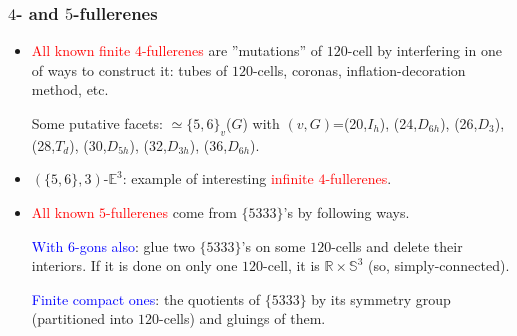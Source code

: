 \documentclass{beamer}
\begin{document}
\begin{frame}\frametitle{ $4$- and $5$-fullerenes}
\vspace{-2mm} 

\begin{itemize}
\item \textcolor{red}{All known finite $4$-fullerenes} are ''mutations'' of  
$120$-cell 
by interfering in 
one of ways to 
construct it: tubes of $120$-cells, coronas, inflation-decoration method, etc.

Some putative facets: $\simeq \{5,6\}_v$($G$) with $(v,G)$=(20,$I_h$), 
(24,$D_{6h}$), (26,$D_3$), (28,$T_d$), (30,$D_{5h}$), (32,$D_{3h}$), (36,$D_{6h}$).
\item $(\{5,6\},3)$-$\mathbb{E}^3$: example of
interesting \textcolor{red}{infinite $4$-fullerenes}.
\pause

\item 
\textcolor{red}{All known $5$-fullerenes} come from $\{5333\}$'s by following  
ways.

\textcolor{blue}{With $6$-gons also}: glue two $\{5333\}$'s on some
$120$-cells and delete their interiors. If it is done on
only one $120$-cell, it is $ \mathbb{R} \times \mathbb{S}^3$
(so, simply-connected).

\textcolor{blue}{Finite compact ones}: the  quotients of $\{5333\}$ by its
symmetry
group  
 (partitioned into  $120$-cells) and gluings of them.


\end{itemize}
\end{frame}


\end{document}
